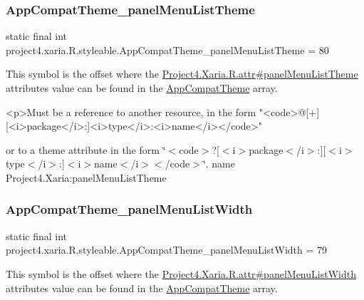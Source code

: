 \subsubsection{\texorpdfstring{App\+Compat\+Theme\+\_\+panel\+Menu\+List\+Theme}{AppCompatTheme\_panelMenuListTheme}}
{\footnotesize\ttfamily static final int project4.\+xaria.\+R.\+styleable.\+App\+Compat\+Theme\+\_\+panel\+Menu\+List\+Theme = 80\hspace{0.3cm}{\ttfamily [static]}}

This symbol is the offset where the \hyperlink{}{Project4.\+Xaria.\+R.\+attr\#panel\+Menu\+List\+Theme} attribute\textquotesingle{}s value can be found in the \hyperlink{classproject4_1_1xaria_1_1R_1_1styleable_aad8bec413e2350f9404e6ff0e831a85d}{App\+Compat\+Theme} array.

\begin{DoxyVerb}      <p>Must be a reference to another resource, in the form "<code>@[+][<i>package</i>:]<i>type</i>:<i>name</i></code>"
\end{DoxyVerb}
 or to a theme attribute in the form \char`\"{}$<$code$>$?\mbox{[}$<$i$>$package$<$/i$>$\+:\mbox{]}\mbox{[}$<$i$>$type$<$/i$>$\+:\mbox{]}$<$i$>$name$<$/i$>$$<$/code$>$\char`\"{}.  name Project4.\+Xaria\+:panel\+Menu\+List\+Theme \mbox{\label{classproject4_1_1xaria_1_1R_1_1styleable_a43aec01657d9d84df72132aef49c3979}} 
\subsubsection{\texorpdfstring{App\+Compat\+Theme\+\_\+panel\+Menu\+List\+Width}{AppCompatTheme\_panelMenuListWidth}}
{\footnotesize\ttfamily static final int project4.\+xaria.\+R.\+styleable.\+App\+Compat\+Theme\+\_\+panel\+Menu\+List\+Width = 79\hspace{0.3cm}{\ttfamily [static]}}

This symbol is the offset where the \hyperlink{}{Project4.\+Xaria.\+R.\+attr\#panel\+Menu\+List\+Width} attribute\textquotesingle{}s value can be found in the \hyperlink{classproject4_1_1xaria_1_1R_1_1styleable_aad8bec413e2350f9404e6ff0e831a85d}{App\+Compat\+Theme} array.

